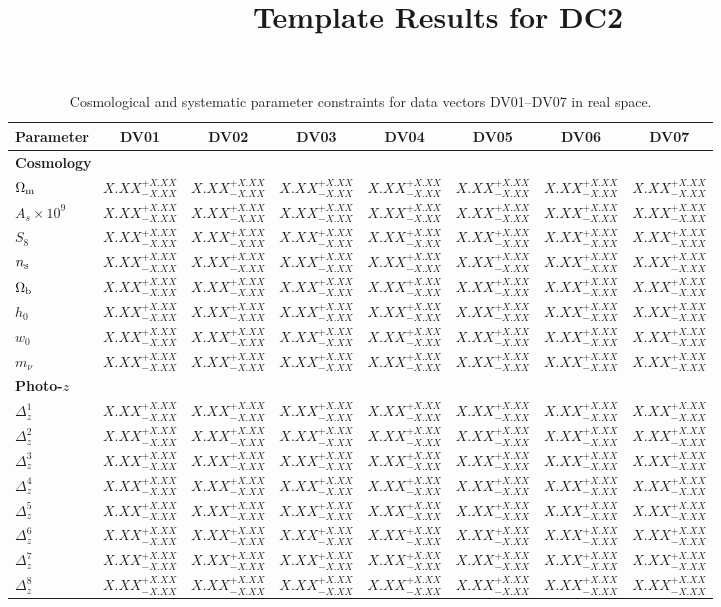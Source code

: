 \documentclass[%
reprint,
superscriptaddress,
 amsmath,amssymb,
 aps,
]{revtex4-2}
\newcommand{\dvres}{$X.XX^{+X.XX}_{-X.XX}$}
\begin{document}

\title{Template Results for DC2}

\maketitle
\begin{table}[htbp]
\centering
\caption{Cosmological and systematic parameter constraints
for data vectors DV01--DV07 in real space.}
\label{tab:results_a}
\footnotesize
\setlength{\tabcolsep}{8pt}
\renewcommand{\arraystretch}{1.15}

\begin{tabular}{l*{7}{c}}
\hline\hline
Parameter & DV01 & DV02 & DV03 & DV04 & DV05 & DV06 & DV07 \\
\hline

\multicolumn{8}{l}{\textbf{Cosmology}} \\
\hline
$\Omega_{\rm m}$ & \dvres & \dvres & \dvres & \dvres & \dvres & \dvres & \dvres \\
$A_s\times 10^9$ & \dvres & \dvres & \dvres & \dvres & \dvres & \dvres & \dvres \\
$S_8$ & \dvres & \dvres & \dvres & \dvres & \dvres & \dvres & \dvres \\
$n_{\rm s}$ & \dvres & \dvres & \dvres & \dvres & \dvres & \dvres & \dvres \\
$\Omega_{\rm b}$ & \dvres & \dvres & \dvres & \dvres & \dvres & \dvres & \dvres \\
$h_0$ & \dvres & \dvres & \dvres & \dvres & \dvres & \dvres & \dvres \\
$w_0$ & \dvres & \dvres & \dvres & \dvres & \dvres & \dvres & \dvres \\
$m_\nu$ & \dvres & \dvres & \dvres & \dvres & \dvres & \dvres & \dvres \\

\hline
\multicolumn{8}{l}{\textbf{Photo-$z$}} \\
\hline
$\Delta_z^1$ & \dvres & \dvres & \dvres & \dvres & \dvres & \dvres & \dvres \\
$\Delta_z^2$ & \dvres & \dvres & \dvres & \dvres & \dvres & \dvres & \dvres \\
$\Delta_z^3$ & \dvres & \dvres & \dvres & \dvres & \dvres & \dvres & \dvres \\
$\Delta_z^4$ & \dvres & \dvres & \dvres & \dvres & \dvres & \dvres & \dvres \\
$\Delta_z^5$ & \dvres & \dvres & \dvres & \dvres & \dvres & \dvres & \dvres \\
$\Delta_z^6$ & \dvres & \dvres & \dvres & \dvres & \dvres & \dvres & \dvres \\
$\Delta_z^7$ & \dvres & \dvres & \dvres & \dvres & \dvres & \dvres & \dvres \\
$\Delta_z^8$ & \dvres & \dvres & \dvres & \dvres & \dvres & \dvres & \dvres \\


\end{tabular}
\end{table}
\end{document}
